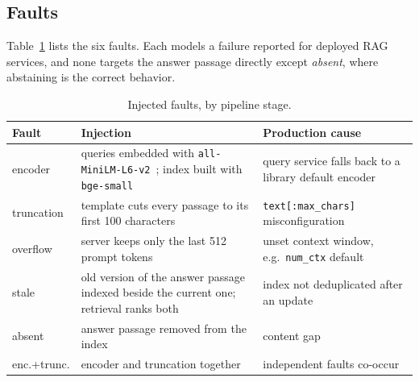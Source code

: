 \subsection{Faults}
Table~\ref{tab:faults} lists the six faults. Each models a failure reported for deployed RAG
services, and none targets the answer passage directly except \emph{absent}, where abstaining is the
correct behavior.

\begin{table}[t]
\caption{Injected faults, by pipeline stage.}\label{tab:faults}
\small
\begin{tabular}{@{}p{1.55cm}p{3.15cm}p{2.9cm}@{}}
\toprule
Fault & Injection & Production cause \\
\midrule
encoder & queries embedded with \texttt{all-MiniLM-L6-v2}~\cite{reimers2019sbert}; index built with \texttt{bge-small} & query service falls back to a library default encoder \\
truncation & template cuts every passage to its first 100 characters & \texttt{text[:max\_chars]} misconfiguration \\
overflow & server keeps only the last 512 prompt tokens & unset context window, e.g.\ \texttt{num\_ctx} default~\cite{musetoiu2026ragal,ragflow_ollama_ctx} \\
stale & old version of the answer passage indexed beside the current one; retrieval ranks both & index not deduplicated after an update~\cite{ouyang2025hoh} \\
absent & answer passage removed from the index & content gap \\
enc.+trunc. & encoder and truncation together & independent faults co-occur \\
\bottomrule
\end{tabular}
\end{table}

